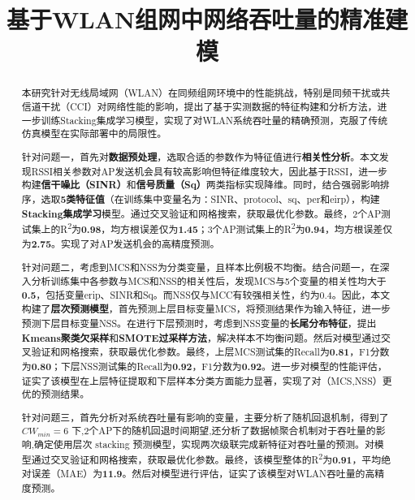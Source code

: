 \documentclass[bwprint]{gmcmthesis}
\title{基于WLAN组网中网络吞吐量的精准建模}
\begin{document}
\maketitle

\begin{abstract}

本研究针对无线局域网（WLAN）在同频组网环境中的性能挑战，特别是同频干扰或共信道干扰（CCI）对网络性能的影响，提出了基于实测数据的特征构建和分析方法，进一步训练Stacking集成学习模型，实现了对WLAN系统吞吐量的精确预测，克服了传统仿真模型在实际部署中的局限性。


针对问题一，首先对\textbf{数据预处理}，选取合适的参数作为特征值进行\textbf{相关性分析}。本文发现RSSI相关参数对AP发送机会具有较高影响但特征维度较大，因此基于RSSI，进一步构建\textbf{信干噪比（SINR）}和\textbf{信号质量（Sq）}两类指标实现降维。同时，结合强弱影响排序，选取\textbf{5类特征值}（在训练集中变量名为：SINR、protocol、sq、per和eirp），构建\textbf{Stacking集成学习}模型。通过交叉验证和网格搜索，获取最优化参数。最终，2个AP测试集上的R\textsuperscript{2}为\textbf{0.98}，均方根误差仅为\textbf{1.45}；3个AP测试集上的R\textsuperscript{2}为\textbf{0.94}，均方根误差仅为\textbf{2.75}。实现了对AP发送机会的高精度预测。

针对问题二，考虑到MCS和NSS为分类变量，且样本比例极不均衡。结合问题一，在深入分析训练集中各参数与MCS和NSS的相关性后，发现MCS与5个变量的相关性均大于\textbf{0.5}，包括变量erip、SINR和Sq。而NSS仅与MCC有较强相关性，约为0.4。因此，本文构建了\textbf{层次预测模型}，首先预测上层目标变量MCS，将预测结果作为输入特征，进一步预测下层目标变量NSS。在进行下层预测时，考虑到NSS变量的\textbf{长尾分布特征}，提出\textbf{Kmeans聚类欠采样}和\textbf{SMOTE过采样方法}，解决样本不均衡问题。然后对模型通过交叉验证和网格搜索，获取最优化参数。最终，上层MCS测试集的Recall为\textbf{0.81}，F1分数为\textbf{0.80}；下层NSS测试集的Recall为\textbf{0.92}，F1分数为\textbf{0.92}。进一步对模型的性能评估，证实了该模型在上层特征提取和下层样本分类方面能力显著，实现了对（MCS,NSS）更优的预测结果。

针对问题三，首先分析对系统吞吐量有影响的变量，主要分析了随机回退机制，得到了$CW_{min}=6$ 下,2个AP下的随机回退时间期望,还分析了数据帧聚合机制对于吞吐量的影响,确定使用层次 stacking 预测模型，实现两次级联完成新特征对吞吐量的预测。对模型通过交叉验证和网格搜索，获取最优化参数。最终，该模型整体的R\textsuperscript{2}为\textbf{0.91}，平均绝对误差（MAE）为\textbf{11.9}。然后对模型进行评估，证实了该模型对WLAN吞吐量的高精度预测。


\end{abstract}
\end{document}
